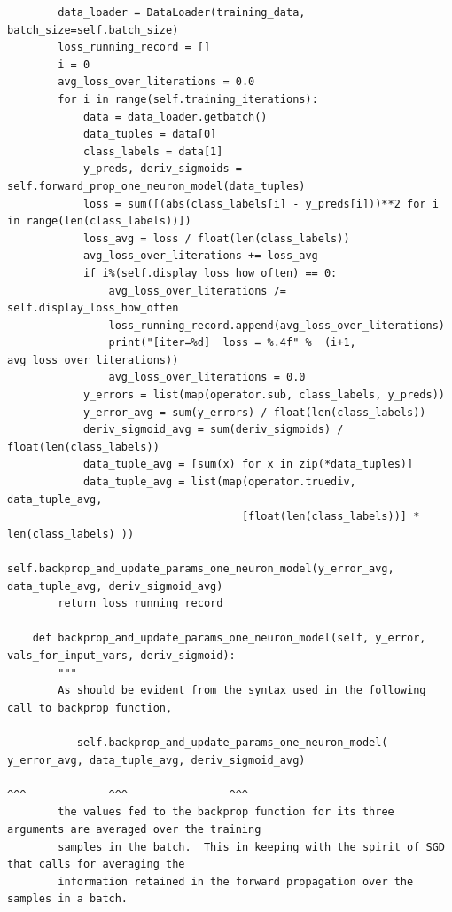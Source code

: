 \documentclass{article}
\begin{document}
\begin{verbatim}
        data_loader = DataLoader(training_data, batch_size=self.batch_size)
        loss_running_record = []
        i = 0
        avg_loss_over_literations = 0.0
        for i in range(self.training_iterations):
            data = data_loader.getbatch()
            data_tuples = data[0]
            class_labels = data[1]
            y_preds, deriv_sigmoids =  self.forward_prop_one_neuron_model(data_tuples)
            loss = sum([(abs(class_labels[i] - y_preds[i]))**2 for i in range(len(class_labels))])
            loss_avg = loss / float(len(class_labels))
            avg_loss_over_literations += loss_avg
            if i%(self.display_loss_how_often) == 0:
                avg_loss_over_literations /= self.display_loss_how_often
                loss_running_record.append(avg_loss_over_literations)
                print("[iter=%d]  loss = %.4f" %  (i+1, avg_loss_over_literations))
                avg_loss_over_literations = 0.0
            y_errors = list(map(operator.sub, class_labels, y_preds))
            y_error_avg = sum(y_errors) / float(len(class_labels))
            deriv_sigmoid_avg = sum(deriv_sigmoids) / float(len(class_labels))
            data_tuple_avg = [sum(x) for x in zip(*data_tuples)]
            data_tuple_avg = list(map(operator.truediv, data_tuple_avg,
                                     [float(len(class_labels))] * len(class_labels) ))
            self.backprop_and_update_params_one_neuron_model(y_error_avg, data_tuple_avg, deriv_sigmoid_avg)
        return loss_running_record
        
    def backprop_and_update_params_one_neuron_model(self, y_error, vals_for_input_vars, deriv_sigmoid):
        """
        As should be evident from the syntax used in the following call to backprop function,

           self.backprop_and_update_params_one_neuron_model( y_error_avg, data_tuple_avg, deriv_sigmoid_avg)
                                                                     ^^^             ^^^                ^^^
        the values fed to the backprop function for its three arguments are averaged over the training
        samples in the batch.  This in keeping with the spirit of SGD that calls for averaging the
        information retained in the forward propagation over the samples in a batch.


\end{verbatim}
\end{document}
